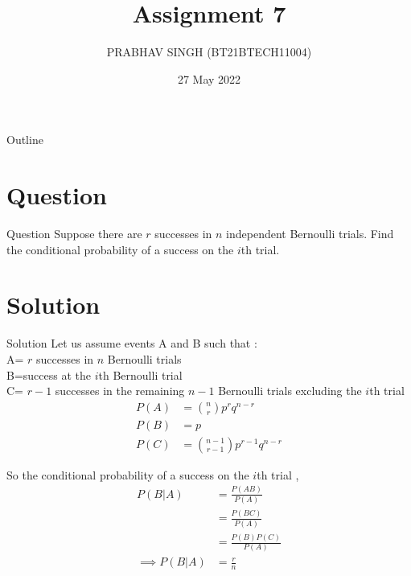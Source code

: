 \documentclass{beamer}
\title{Assignment 7}
\author{PRABHAV SINGH (BT21BTECH11004)}
\date{27 May 2022}
\begin{document}
	
	\begin{frame}
		\titlepage 
	\end{frame}
	
	\logo{}
	
	
	\begin{frame}{Outline}
		\tableofcontents
	\end{frame}
	
	\section{Question}
	\begin{frame}{Question}
	Suppose there are $  r  $ successes in $ n $ independent Bernoulli trials. Find the conditional probability of a success on the $ i $th trial.
		
	\end{frame}
	
	
	\section{Solution}
	\begin{frame}{Solution}
	Let us assume events A and B such that :\\
	A= $ r $ successes in $ n $ Bernoulli trials \\
	B=success at the $ i $th Bernoulli trial\\
	C= $ r-1 $ successes in the remaining $ n-1 $ Bernoulli trials excluding 
	the $ i $th trial \\
	\begin{align}
		P(A) &= \binom{n}{r}p^{r}q^{n-r}\\
		P(B) &= p\\
		P(C) &= \binom{n-1}{r-1}p^{r-1}q^{n-r}
	\end{align}
	\end{frame}
	\begin{frame}
	So the conditional probability of a success on the $ i $th trial ,\\
	\begin{align}
		P({B|A}) &= \frac{P(AB)}{P(A)} \\
		&= \frac{P(BC)}{P(A)}\\
		&= \frac{P(B)P(C)}{P(A)}\\
		\implies P(B|A)	&= \frac{r}{n}
	\end{align}
	\end{frame}
	
\end{document}
